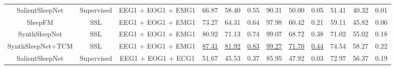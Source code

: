 \begin{table*}[!htbp]
{{\begin{tabular}{c|c|c|ccc|ccc|ccc}
\hline
SalientSleepNet \cite{ref9}                                                                       & Supervised                                                                                 & EEG1
  + EOG1 + EMG1                       & 66.87          & 58.40          & 0.55                                                                      & 90.31          & 50.00          & 0.05                                                          & 51.41          & 40.32          & 0.01                                                             \\
SleepFM  \cite{ref23}                                                                              & SSL                                                                                        & EEG1
  + EOG1 + EMG1                       & 73.27          & 64.31          & 0.64                                                                      & 97.98          & 60.42          & 0.21                                                          & 59.11          & 45.82          & 0.06                                                             \\
SynthSleepNet                                                                          & SSL                                                                                        & EEG1
  + EOG1 + EMG1                       & 80.92          & 71.13          & 0.74                                                                      & 99.07          & 68.72          & 0.38                                                          & 71.02          & 55.02          & 0.18                                                             \\
SynthSleepNet+TCM                                                                      & SSL                                                                                        & EEG1
  + EOG1 + EMG1                       & \uline{87.41}  & \uline{81.92}  & \uline{0.83}                                                              & \uline{99.27}  & \uline{71.70}  & \uline{0.44}                                                  & 74.54          & 58.27          & 0.22                                                             \\ 
\hline
SalientSleepNet \cite{ref9}                                                                        & Supervised                                                                                 & EEG1
  + EOG1 + ECG1                       & 51.67          & 45.53          & 0.37                                                                      & 85.95          & 47.92          & 0.03                                                          & 72.97          & 56.37          & 0.19                                                             \\

\end{tabular}}}
\end{table*}
